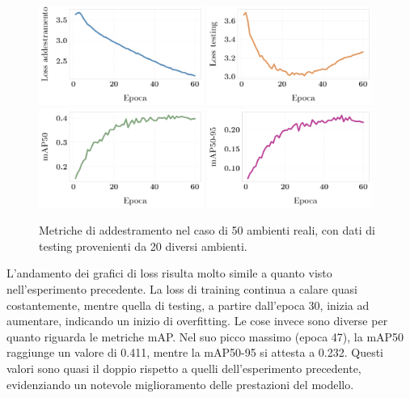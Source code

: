 \documentclass[12pt]{report}
\begin{document}
\begin{figure}[h!]
	\centering
	{\includegraphics[width=0.48\textwidth]{images/domain-shift/real-to-real/3/train-loss}}
	\hspace{0.01\textwidth}
	{\includegraphics[width=0.48\textwidth]{images/domain-shift/real-to-real/3/testing-loss}}
	\hspace{0.01\textwidth}
	\\
	{\includegraphics[width=0.48\textwidth]{images/domain-shift/real-to-real/3/map50}}
	\hspace{0.01\textwidth}
	{\includegraphics[width=0.48\textwidth]{images/domain-shift/real-to-real/3/map50-95}}
	\caption{Metriche di addestramento nel caso di 50 ambienti reali, con dati di testing provenienti da 20 diversi ambienti.}
	\label{fig:training-5}
\end{figure}

L'andamento dei grafici di loss risulta molto simile a quanto visto nell'esperimento precedente. La loss di training continua a calare quasi costantemente, mentre quella di testing, a partire dall'epoca 30, inizia ad aumentare, indicando un inizio di overfitting. Le cose invece sono diverse per quanto riguarda le metriche mAP. Nel suo picco massimo (epoca 47), la mAP50 raggiunge un valore di 0.411, mentre la mAP50-95 si attesta a 0.232. Questi valori sono quasi il doppio rispetto a quelli dell'esperimento precedente, evidenziando un notevole miglioramento delle prestazioni del modello.
\end{document}

